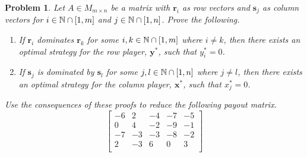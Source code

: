 \documentclass[12pt,oneside]{amsart}
\numberwithin{equation}{section}
\numberwithin{figure}{section}
\theoremstyle{plain}
\newtheorem{prob}{Problem}
\theoremstyle{definition}
\newcommand{\N}{\ensuremath \mathbb{N}}
\begin{document}
\begin{prob}
  Let $A \in M_{m \times n}$ be a matrix with $\mathbf{r}_i$ as row vectors and 
  $\mathbf{s}_j$ as column vectors for $i \in \N \cap [1,m]$ and $j \in \N \cap 
  [1,n]$. Prove the following. \\
  \begin{enumerate}
    \item If $\mathbf{r}_i$ dominates $\mathbf{r}_k$ for some $i,k \in \N \cap 
      [1,m]$ where $i \neq k$, then there exists an optimal strategy for the row 
      player, $\mathbf{y}^*$, such that $y^*_i = 0$. \\
    \item If $\mathbf{s}_j$ is dominated by $\mathbf{s}_l$ for some $j,l \in \N 
      \cap [1,n]$ where $j \neq l$, then there exists an optimal strategy for the 
      column player, $\mathbf{x}^*$, such that $x^*_j = 0$. \\
  \end{enumerate}
  Use the consequences of these proofs to reduce the following payout matrix. \\
  \[\begin{bmatrix}
    -6 & 2  & -4 & -7 & -5 \\
    0  & 4  & -2 & -9 & -1 \\
    -7 & -3 & -3 & -8 & -2 \\
    2  & -3 & 6  & 0  & 3  \\
  \end{bmatrix}\] \\
\end{prob} \pagebreak
\end{document}
